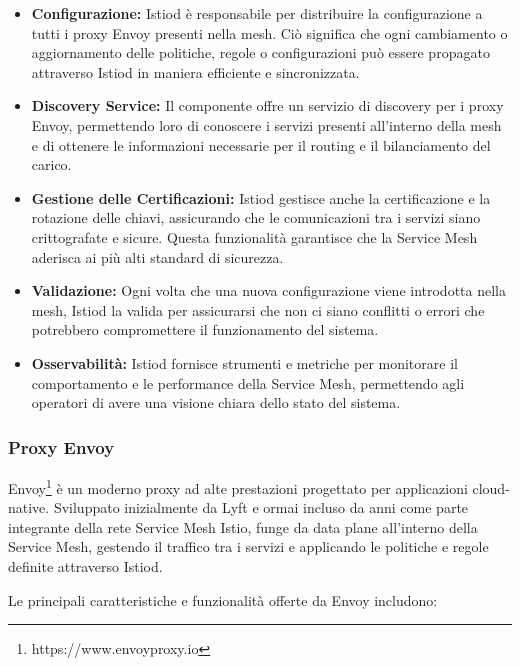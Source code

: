 \begin{itemize}
    \item \textbf{Configurazione:} Istiod è responsabile per distribuire la configurazione a tutti i proxy Envoy presenti nella mesh. Ciò significa che ogni cambiamento o aggiornamento delle politiche, regole o configurazioni può essere propagato attraverso Istiod in maniera efficiente e sincronizzata.
    
    \item \textbf{Discovery Service:} Il componente offre un servizio di discovery per i proxy Envoy, permettendo loro di conoscere i servizi presenti all'interno della mesh e di ottenere le informazioni necessarie per il routing e il bilanciamento del carico.
    
    \item \textbf{Gestione delle Certificazioni:} Istiod gestisce anche la certificazione e la rotazione delle chiavi, assicurando che le comunicazioni tra i servizi siano crittografate e sicure. Questa funzionalità garantisce che la Service Mesh aderisca ai più alti standard di sicurezza.
    
    \item \textbf{Validazione:} Ogni volta che una nuova configurazione viene introdotta nella mesh, Istiod la valida per assicurarsi che non ci siano conflitti o errori che potrebbero compromettere il funzionamento del sistema.
    
    \item \textbf{Osservabilità:} Istiod fornisce strumenti e metriche per monitorare il comportamento e le performance della Service Mesh, permettendo agli operatori di avere una visione chiara dello stato del sistema.
\end{itemize}


\subsubsection{Proxy Envoy}

Envoy\footnote{https://www.envoyproxy.io} è un moderno proxy ad alte prestazioni progettato per applicazioni cloud-native. Sviluppato inizialmente da Lyft e ormai incluso da anni come parte integrante della rete Service Mesh Istio, funge da data plane all'interno della Service Mesh, gestendo il traffico tra i servizi e applicando le politiche e regole definite attraverso Istiod.

Le principali caratteristiche e funzionalità offerte da Envoy includono:

